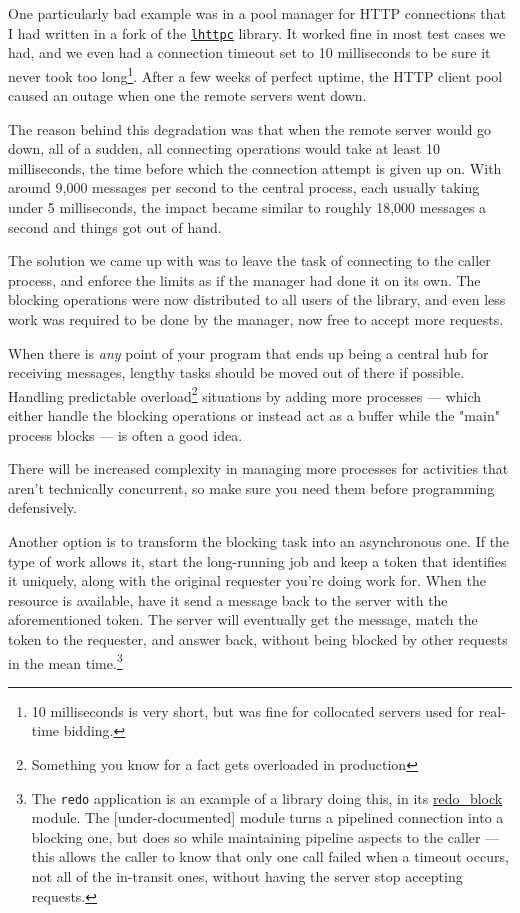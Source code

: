 \documentclass[11pt, oneside]{book}   	%
\newcommand{\otpapp}[1]{\Verb`#1`}
\newcommand{\module}[1]{\Verb`#1`}
\begin{document}
One particularly bad example was in a pool manager for HTTP connections that I had written in a fork of the \href{https://github.com/ferd/lhttpc}{\module{lhttpc}} library. It worked fine in most test cases we had, and we even had a connection timeout set to 10 milliseconds to be sure it never took too long\footnote{10 milliseconds is very short, but was fine for collocated servers used for real-time bidding.}. After a few weeks of perfect uptime, the HTTP client pool caused an outage when one the remote servers went down.

The reason behind this degradation was that when the remote server would go down, all of a sudden, all connecting operations would take at least 10 milliseconds, the time before which the connection attempt is given up on. With around 9,000 messages per second to the central process, each usually taking under 5 milliseconds, the impact became similar to roughly 18,000 messages a second and things got out of hand.

The solution we came up with was to leave the task of connecting to the caller process, and enforce the limits as if the manager had done it on its own. The blocking operations were now distributed to all users of the library, and even less work was required to be done by the manager, now free to accept more requests.

When there is \emph{any} point of your program that ends up being a central hub for receiving messages, lengthy tasks should be moved out of there if possible. Handling predictable overload\footnote{Something you know for a fact gets overloaded in production} situations by adding more processes — which either handle the blocking operations or instead act as a buffer while the "main" process blocks — is often a good idea.

There will be increased complexity in managing more processes for activities that aren't technically concurrent, so make sure you need them before programming defensively.

Another option is to transform the blocking task into an asynchronous one. If the type of work allows it, start the long-running job and keep a token that identifies it uniquely, along with the original requester you're doing work for. When the resource is available, have it send a message back to the server with the aforementioned token. The server will eventually get the message, match the token to the requester, and answer back, without being blocked by other requests in the mean time.\footnote{The \otpapp{redo} application is an example of a library doing this, in its \href{https://github.com/heroku/redo/blob/master/src/redo\_block.erl}{redo\_block} module. The [under-documented] module turns a pipelined connection into a blocking one, but does so while maintaining pipeline aspects to the caller — this allows the caller to know that only one call failed when a timeout occurs, not all of the in-transit ones, without having the server stop accepting requests.}
\end{document}
